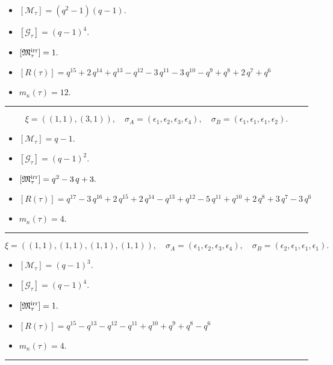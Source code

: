 \documentclass[10pt,a4paper]{amsart}
\begin{document}
\begin{itemize}
 \item $[\mathcal{M}_{\tau}] = {\left(q^{2} - 1\right)} {\left(q - 1\right)} .$

 \item $[\mathcal{G}_{\tau}] = {\left(q - 1\right)}^{4} .$

 \item $[{\frak M}_{\tau}^{\textrm{irr}}] = 1 .$

 \item $[R(\tau)] = q^{15} + 2 \, q^{14} + q^{13} - q^{12} - 3 \, q^{11} - 3 \, q^{10} - q^{9} + q^{8} + 2 \, q^{7} + q^{6} $

 \item $m_{\kappa}(\tau) = 12 .$

 \end{itemize}
\noindent\rule{8cm}{0.4pt}

$$\xi = ({(1, 1)}, {(3, 1)}),\quad \sigma_A = ({{\epsilon_1}}, {{\epsilon_2, \epsilon_3, \epsilon_4}}),\quad \sigma_B = ({{\epsilon_1}}, {{\epsilon_1, \epsilon_1, \epsilon_2}}).$$

\begin{itemize}
 \item $[\mathcal{M}_{\tau}] = q - 1 .$

 \item $[\mathcal{G}_{\tau}] = {\left(q - 1\right)}^{2} .$

 \item $[{\frak M}_{\tau}^{\textrm{irr}}] = q^{2} - 3 \, q + 3 .$

 \item $[R(\tau)] = q^{17} - 3 \, q^{16} + 2 \, q^{15} + 2 \, q^{14} - q^{13} + q^{12} - 5 \, q^{11} + q^{10} + 2 \, q^{8} + 3 \, q^{7} - 3 \, q^{6} $

 \item $m_{\kappa}(\tau) = 4 .$

 \end{itemize}
\noindent\rule{8cm}{0.4pt}

$$\xi = ({(1, 1)}, {(1, 1), (1, 1), (1, 1)}),\quad \sigma_A = ({{\epsilon_1}}, {{\epsilon_2}, {\epsilon_3}, {\epsilon_4}}),\quad \sigma_B = ({{\epsilon_2}}, {{\epsilon_1}, {\epsilon_1}, {\epsilon_1}}).$$

\begin{itemize}
 \item $[\mathcal{M}_{\tau}] = {\left(q - 1\right)}^{3} .$

 \item $[\mathcal{G}_{\tau}] = {\left(q - 1\right)}^{4} .$

 \item $[{\frak M}_{\tau}^{\textrm{irr}}] = 1 .$

 \item $[R(\tau)] = q^{15} - q^{13} - q^{12} - q^{11} + q^{10} + q^{9} + q^{8} - q^{6} $

 \item $m_{\kappa}(\tau) = 4 .$

 \end{itemize}
\noindent\rule{8cm}{0.4pt}
\end{document}
